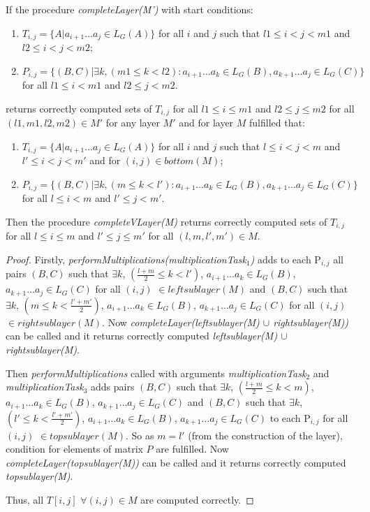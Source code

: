\begin{lemma}
If the procedure \textit{completeLayer(M')} with start conditions:
\begin{enumerate}
  \item $T_{i, j} = \{ A |  a_{i + 1} \dots a_{j} \in L_G(A)\}$ for all $i$ and $j$ such that $l1 \leq i < j < m1$ and $l2 \leq i < j < m2$;
  \item $P_{i, j} =  \{ (B, C) |\exists k, (m1 \le k < l2): a_{i + 1} \dots a_{k} \in L_G(B), a_{k + 1} \dots a_{j} \in L_G(C)\}$ for all $l1 \leq i < m1$ and $l2 \leq j < m2$.
\end{enumerate}
returns correctly computed sets of $T_{i, j}$ for all $l1 \leq i \le m1$ and $l2 \leq j \le m2$ for all $(l1, m1, l2, m2) \in M'$ for any layer $M'$ 
and for layer $M$ fulfilled that: 
\begin{enumerate}
  \item $T_{i, j} = \{ A |  a_{i + 1} \dots a_{j} \in L_G(A)\}$ for all $i$ and $j$ such that $l \leq i < j < m$ and $l' \leq i < j < m'$ and for $(i, j) \in bottom(M)$;
  \item $P_{i, j} =  \{ (B, C) |\exists k, (m \le k < l'): a_{i + 1} \dots a_{k} \in L_G(B), a_{k + 1} \dots a_{j} \in L_G(C)\}$ for all $l \leq i < m$ and $l' \leq j < m'$.
\end{enumerate}

Then the procedure \textit{completeVLayer(M)} returns correctly computed sets of $T_{i, j}$ for all $l \leq i \le m$ and $l' \leq j \le m'$ for all $(l, m, l', m') \in M$. 
\end{lemma}

\begin{proof}

Firstly, \textit{performMultiplications(multiplicationTask$_1$)} adds to each P$_{i,j}$ all pairs 
$(B, C)$ such that $\exists k$, $(\frac{l+m}{2} \le k < l')$, $a_{i + 1} \dots a_{k} \in L_{G}(B)$, $a_{k + 1} \dots a_{j} \in L_{G}(C)$ for all $(i, j)$ $\in leftsublayer(M)$
and
$(B, C)$ such that $\exists k$, $(m \le k < \frac{l'+m'}{2})$, $a_{i + 1} \dots a_{k} \in L_{G}(B)$, $a_{k + 1} \dots a_{j} \in L_{G}(C)$ for all $(i, j)$ $\in rightsublayer(M)$.
Now \textit{completeLayer(leftsublayer(M) $\cup$ rightsublayer(M))} can be called and it returns correctly computed \textit{leftsublayer(M) $\cup$ rightsublayer(M)}.

Then \textit{performMultiplications} called with arguments 
\textit{multiplicationTask$_2$} and \textit{multiplicationTask$_3$} adds pairs 
$(B, C)$ such that $\exists k$, $(\frac{l+m}{2} \le k < m)$, $a_{i + 1} \dots a_{k} \in L_{G}(B)$, $a_{k + 1} \dots a_{j} \in L_{G}(C)$ 
and 
$(B, C)$ such that $\exists k$, $(l' \le k < \frac{l'+m'}{2})$, $a_{i + 1} \dots a_{k} \in L_{G}(B)$, $a_{k + 1} \dots a_{j} \in L_{G}(C)$
to each P$_{i,j}$ for all $(i, j)$ $\in topsublayer(M)$. 
So as $m = l'$ (from the construction of the layer), condition for elements of matrix $P$ are fulfilled.
Now \textit{completeLayer(topsublayer(M))} can be called and it returns correctly computed \textit{topsublayer(M)}.

Thus, all $T[i, j]$ $\forall (i, j) \in M$ are computed correctly.

\end{proof}

